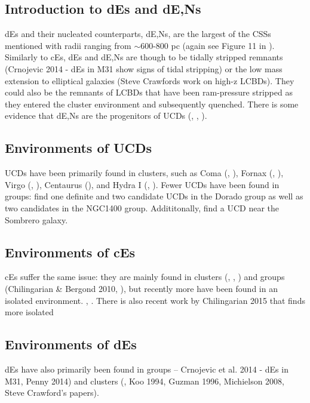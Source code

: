 \documentclass[iop,apj,twocolappendix]{emulateapj}
\begin{document}
\subsection{Introduction to dEs and dE,Ns}
dEs and their nucleated counterparts, dE,Ns, are the largest of the CSSs mentioned with radii ranging from $\sim$600-800 pc (again see Figure 11 in \citet{Norris2014}). Similarly to cEs, dEs and dE,Ns are though to be tidally stripped remnants (Crnojevic 2014 - dEs in M31 show signs of tidal stripping) or the low mass extension to elliptical galaxies (Steve Crawfords work on high-z LCBDs). They could also be the remnants of LCBDs that have been ram-pressure stripped as they entered the cluster environment and subsequently quenched. There is some evidence that dE,Ns are the progenitors of UCDs (\citet{Pfeffer2013}, \citet{Zhang2015}, \citet{Liu2015}).

\subsection{Environments of UCDs}
UCDs have been primarily found in clusters, such as Coma (\citet{Price2009}, \citet{Madrid2010}), Fornax (\citet{Hilker1999}, \citet{Drinkwater2000}), Virgo (\citet{Hasegan2005}, \citet{Jones2006}), Centaurus (\citet{Mieske2009}), and Hydra I (\citet{Wehner2007}, \citet{Misgeld2008}). Fewer UCDs have been found in groups: \citet{Evstigneeva2007} find one definite and two candidate UCDs in the Dorado group as well as two candidates in the NGC1400 group. Addititonally, \citet{Hau2009} find a UCD near the Sombrero galaxy. 

\subsection{Environments of cEs}
cEs suffer the same issue: they are mainly found in clusters (\citet{Chilingarian2007}, \citet{SmithCastelli2012}, \citet{Price2009}) and groups (Chilingarian \& Bergond 2010, \citet{Huxor2011}), but recently more have been found in an isolated environment. \citet{Huxor2013}, \citet{Paudel2014}. There is also recent work by Chilingarian 2015 that finds more isolated 

\subsection{Environments of dEs}
dEs have also primarily been found in groups -- Crnojevic et al. 2014 - dEs in M31, Penny 2014) and clusters (\citep{SmithCastelli2012}, Koo 1994, Guzman 1996, Michielson 2008, Steve Crawford's papers). 
\end{document}
